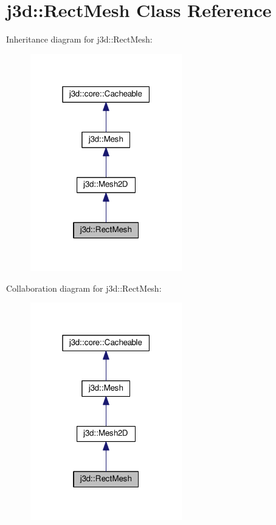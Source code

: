 \hypertarget{classj3d_1_1RectMesh}{}\section{j3d\+:\+:Rect\+Mesh Class Reference}
\label{classj3d_1_1RectMesh}


Inheritance diagram for j3d\+:\+:Rect\+Mesh\+:
\nopagebreak
\begin{figure}[H]
\begin{center}
\leavevmode
\includegraphics[width=187pt]{classj3d_1_1RectMesh__inherit__graph}
\end{center}
\end{figure}


Collaboration diagram for j3d\+:\+:Rect\+Mesh\+:
\nopagebreak
\begin{figure}[H]
\begin{center}
\leavevmode
\includegraphics[width=187pt]{classj3d_1_1RectMesh__coll__graph}
\end{center}
\end{figure}
